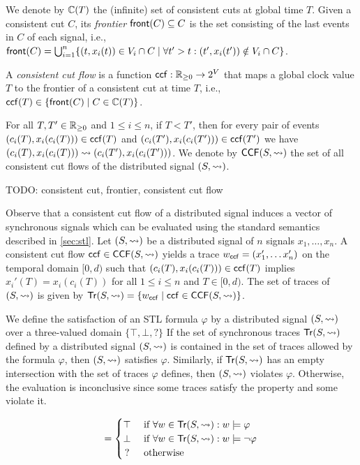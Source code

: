 We denote by $\mathbb{C}(T)$ the (infinite) set of consistent cuts at global time $T$.
Given a consistent cut $C$, its \emph{frontier} $\mathsf{front}(C) \subseteq C$ is the set consisting of the last events in $C$ of each signal, i.e., $\fr(C) = \bigcup_{i = 1}^{n} \{ (t, x_i(t)) \in V_i \cap C \st \forall t' > t : (t', x_i(t')) \notin V_i \cap C \}$.

\begin{definition}
A \emph{consistent cut flow} is a function $\mathsf{ccf} : \mathbb{R}_{\geq 0} \to 2^V$ that maps a global clock value $T$ to the frontier of a consistent cut at time $T$, i.e., $\ccf(T) \in \{\fr(C) \st C \in \CC(T)\}$.
\end{definition}

For all $T,T' \in \mathbb{R}_{\geq 0}$ and $1 \leq i \leq n$, if $T < T'$, then for every pair of events $(c_i(T), x_i(c_i(T))) \in \mathsf{ccf}(T)$ and $(c_i(T'), x_i(c_i(T'))) \in \mathsf{ccf}(T')$ we have $(c_i(T), x_i(c_i(T))) \rightsquigarrow (c_i(T'), x_i(c_i(T')))$.
We denote by $\mathsf{CCF}(S,{\rightsquigarrow})$ the set of all consistent cut flows of the distributed signal $(S,{\rightsquigarrow})$.

\begin{example}
	\alert{TODO: consistent cut, frontier, consistent cut flow}
\end{example}

Observe that a consistent cut flow of a distributed signal induces a vector of synchronous signals which can be evaluated using the standard semantics described in \cref{sec:stl}.
Let $(S,{\rightsquigarrow})$ be a distributed signal of $n$ signals $x_1, \ldots, x_n$.
A consistent cut flow $\mathsf{ccf} \in \mathsf{CCF}(S,{\rightsquigarrow})$ yields a trace $w_{\mathsf{ccf}} = (x'_1, \ldots x'_n)$ on the temporal domain $[0,d)$ such that $(c_i(T), x_i(c_i(T))) \in \mathsf{ccf}(T)$ implies $x_i'(T) = x_i(c_i(T))$ for all $1 \leq i \leq n$ and $T \in [0, d)$.
The set of traces of $(S,{\rightsquigarrow})$ is given by $\tr(S,{\hb}) = \{ w_{\ccf} \st \ccf \in \CCF(S,{\hb})\}$.

We define the satisfaction of an STL formula $\varphi$ by a distributed signal $(S,{\rightsquigarrow})$ over a three-valued domain $\{\top, \bot, {?}\}$
If the set of synchronous traces $\mathsf{Tr}(S,{\rightsquigarrow})$ defined by a distributed signal $(S,{\rightsquigarrow})$ is contained in the set of traces allowed by the formula $\varphi$, then $(S,{\rightsquigarrow})$ satisfies $\varphi$.
Similarly, if $\mathsf{Tr}(S,{\rightsquigarrow})$ has an empty intersection with the set of traces $\varphi$ defines, then $(S,{\rightsquigarrow})$ violates $\varphi$.
Otherwise, the evaluation is inconclusive since some traces satisfy the property and some violate it.

\small
\begin{equation*}
	[(S,{\hb}) \models \varphi] = 
	\begin{cases}
		\top & \text{ if } \forall w \in \tr(S,{\hb}) : w \models \varphi \\
		\bot & \text{ if } \forall w \in \tr(S,{\hb}) : w \models \lnot\varphi \\
		\,? & \text{ otherwise}
	\end{cases}
\end{equation*}
\normalsize

